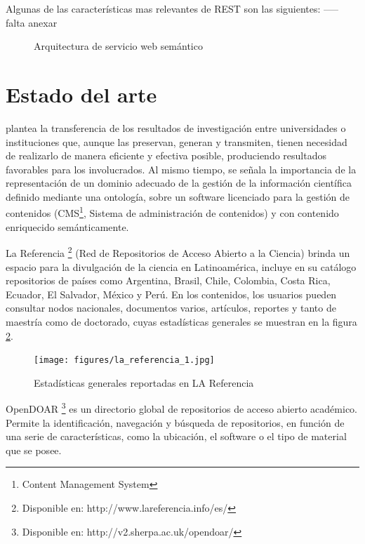 Algunas de las caracter\'isticas mas relevantes de REST son las siguientes: ----- falta anexar

\begin{figure}[!ht]
	\centering
    \caption{Arquitectura de servicio web sem\'antico} %
    \label{arquitect1}
\end{figure}


\section{Estado del arte}

\cite{DrJulioSoler} plantea la transferencia de los resultados de investigaci\'on entre universidades o instituciones que, aunque las preservan, generan y transmiten, tienen necesidad de realizarlo de manera eficiente y efectiva posible, produciendo resultados favorables para los involucrados. Al mismo tiempo, se señala la importancia de la representaci\'on de un dominio adecuado de la gesti\'on de la informaci\'on cient\'ifica definido mediante una ontolog\'ia, sobre un software licenciado para la gesti\'on de contenidos (CMS\footnote{Content Management System}, Sistema de administraci\'on de contenidos) y con contenido enriquecido sem\'anticamente. \newline

La Referencia\cite{LaReferencia} \footnote{Disponible en: http://www.lareferencia.info/es/} (Red de Repositorios de Acceso Abierto a la Ciencia) brinda un espacio para la divulgaci\'on de la ciencia en Latinoam\'erica, incluye en su cat\'alogo repositorios de pa\'ises como Argentina, Brasil, Chile, Colombia, Costa Rica, Ecuador, El Salvador, M\'exico y Per\'u. En los contenidos, los usuarios pueden consultar nodos nacionales, documentos varios, art\'iculos, reportes y  tanto de maestr\'ia como de doctorado, cuyas estad\'isticas generales se muestran en la figura \ref{la-referencia}.

\begin{figure}[!ht]
	\centering
	\texttt{[image: figures/la\_referencia\_1.jpg]} %
    \caption{Estad\'isticas generales reportadas en LA Referencia} %
    \label{la-referencia}
\end{figure}

OpenDOAR \footnote{Disponible en: http://v2.sherpa.ac.uk/opendoar/} es un directorio global de repositorios de acceso abierto acad\'emico. Permite la identificaci\'on, navegaci\'on y b\'usqueda de repositorios, en funci\'on de una serie de caracter\'isticas, como la ubicaci\'on, el software o el tipo de material que se posee. \newline

